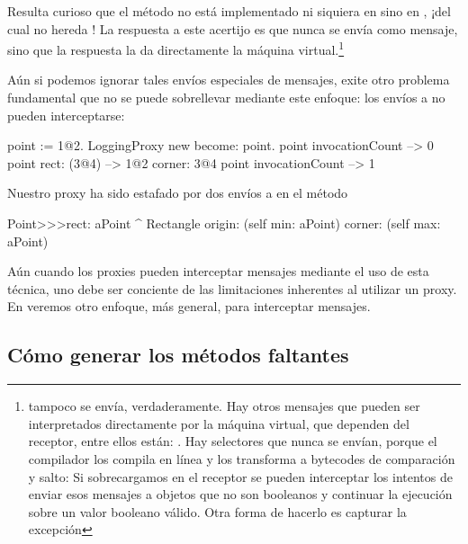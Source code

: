 \documentclass[a4paper,10pt,twoside]{book}
\begin{document}
Resulta curioso que el m\'etodo  no est\'a implementado ni
siquiera en  sino en , ¡del cual no hereda
!  La respuesta a este acertijo es que 
nunca se env\'ia como mensaje, sino que la respuesta la da directamente
la m\'aquina virtual.\footnote{ tampoco se env\'ia,
  verdaderamente.  Hay otros mensajes que pueden ser interpretados
  directamente por la m\'aquina virtual, que dependen del receptor,
  entre ellos est\'an:
\ct{+- < > <= >= = ~= * / \ ==}
.
Hay selectores que nunca se env\'ian, porque el compilador los compila
en l\'inea y los transforma a bytecodes de comparaci\'on y salto:
Si sobrecargamos  en el receptor se pueden
interceptar los intentos de enviar esos mensajes a objetos que no son
booleanos y continuar la ejecuci\'on sobre un valor booleano v\'alido.
Otra forma de hacerlo es capturar la excepci\'on
}%

A\'un si podemos ignorar tales env\'ios especiales de mensajes, exite otro
problema fundamental que no se puede sobrellevar mediante este
enfoque:  los env\'ios a \self no pueden interceptarse:
\begin{code}{}
point := 1@2.
LoggingProxy new become: point.
point invocationCount --> 0
point rect: (3@4)        --> 1@2 corner: 3@4
point invocationCount --> 1
\end{code}

Nuestro proxy ha sido estafado por dos env\'ios a \self en el
m\'etodo 
\begin{code}{}
Point>>>rect: aPoint
        ^ Rectangle  origin: (self min: aPoint) corner: (self max: aPoint)
\end{code}

A\'un cuando los proxies pueden interceptar mensajes mediante el uso de
esta t\'ecnica, uno debe ser conciente de las limitaciones inherentes al
utilizar un proxy.  En  veremos otro enfoque, m\'as
general, para interceptar mensajes.

\subsection{C\'omo generar los m\'etodos faltantes}
\end{document}
